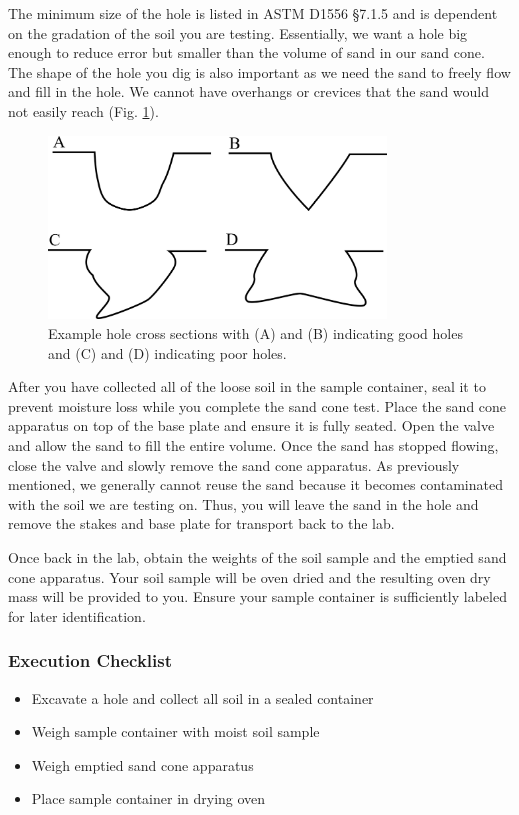 \documentclass[12pt]{article}
\begin{document}
The minimum size of the hole is listed in ASTM D1556 \S7.1.5 and is dependent on the gradation of the soil you are testing. Essentially, we want a hole big enough to reduce error but smaller than the volume of sand in our sand cone. The shape of the hole you dig is also important as we need the sand to freely flow and fill in the hole. We cannot have overhangs or crevices that the sand would not easily reach (Fig. \ref{fig:hole_cross_section}).

\begin{figure}[H]
    \centering
    \includegraphics[width=0.8\textwidth]{hole_cross_section.png}
    \caption{Example hole cross sections with (A) and (B) indicating good holes and (C) and (D) indicating poor holes.}
    \label{fig:hole_cross_section}
\end{figure}

After you have collected all of the loose soil in the sample container, seal it to prevent moisture loss while you complete the sand cone test. Place the sand cone apparatus on top of the base plate and ensure it is fully seated. Open the valve and allow the sand to fill the entire volume. Once the sand has stopped flowing, close the valve and slowly remove the sand cone apparatus. As previously mentioned, we generally cannot reuse the sand because it becomes contaminated with the soil we are testing on. Thus, you will leave the sand in the hole and remove the stakes and base plate for transport back to the lab.

Once back in the lab, obtain the weights of the soil sample and the emptied sand cone apparatus. Your soil sample will be oven dried and the resulting oven dry mass will be provided to you. Ensure your sample container is sufficiently labeled for later identification.

\subsubsection*{Execution Checklist}
\begin{itemize}
    \item Excavate a hole and collect all soil in a sealed container
    \item Weigh sample container with moist soil sample
    \item Weigh emptied sand cone apparatus
    \item Place sample container in drying oven
\end{itemize}
\end{document}
